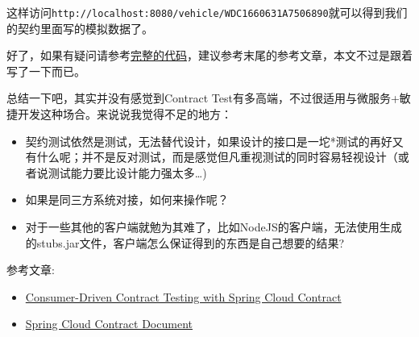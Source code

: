 \documentclass[12pt]{article}
\begin{document}
\begin{Shaded}
\begin{Highlighting}[]
 
\end{Highlighting}
\end{Shaded}

这样访问\texttt{http://localhost:8080/vehicle/WDC1660631A7506890}就可以得到我们的契约里面写的模拟数据了。

好了，如果有疑问请参考\href{https://github.com/soleverlee/spring-contract-example.git}{完整的代码}，建议参考末尾的参考文章，本文不过是跟着写了一下而已。

总结一下吧，其实并没有感觉到Contract Test有多高端，不过很适用与微服务+敏捷开发这种场合。来说说我觉得不足的地方：

\begin{itemize}
\tightlist
\item
  契约测试依然是测试，无法替代设计，如果设计的接口是一坨*测试的再好又有什么呢；并不是反对测试，而是感觉但凡重视测试的同时容易轻视设计（或者说测试能力要比设计能力强太多\ldots)
\item
  如果是同三方系统对接，如何来操作呢？
\item
  对于一些其他的客户端就勉为其难了，比如NodeJS的客户端，无法使用生成的stubs.jar文件，客户端怎么保证得到的东西是自己想要的结果?
\end{itemize}

参考文章:

\begin{itemize}
\tightlist
\item
  \href{https://specto.io/blog/2016/11/16/spring-cloud-contract/}{Consumer-Driven Contract Testing with Spring Cloud Contract}
\item
  \href{http://cloud.spring.io/spring-cloud-contract/spring-cloud-contract.html}{Spring Cloud Contract Document}
\end{itemize}
\end{document}
